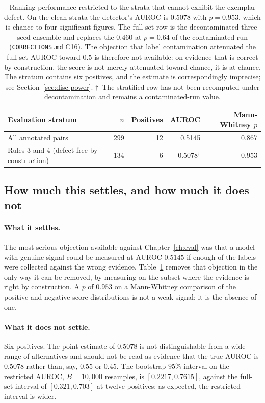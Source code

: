 \begin{table}[t]
\centering
\small
\begin{tabular}{lrrrr}
\toprule
\textbf{Evaluation stratum} & \textbf{$n$} & \textbf{Positives} &
\textbf{AUROC} & \textbf{Mann-Whitney $p$} \\
\midrule
All annotated pairs                      & 299 & 12 & 0.5145 & 0.867 \\
Rules 3 and 4 (defect-free by construction) & 134 & 6  & 0.5078$^{\dagger}$ & 0.953 \\
\bottomrule
\end{tabular}
\caption{Ranking performance restricted to the strata that cannot exhibit the
exemplar defect. On the clean strata the detector's AUROC is $0.5078$ with
$p = 0.953$, which is chance to four significant figures. The full-set row is the
decontaminated three-seed ensemble and replaces the $0.460$ at $p = 0.64$ of the
contaminated run (\texttt{CORRECTIONS.md} C16). The objection that
label contamination attenuated the full-set AUROC toward $0.5$ is
therefore not available: on evidence that is correct by construction, the score
is not merely attenuated toward chance, it is at chance. The stratum contains
six positives, and the estimate is correspondingly imprecise; see
Section~\ref{sec:disc-power}. $\dagger$~The stratified row has not been
recomputed under decontamination and remains a contaminated-run value.}
\label{tab:disc-strata}
\end{table}

\subsection{How much this settles, and how much it does not}

\paragraph{What it settles.} The most serious objection available against
Chapter~\ref{ch:eval} was that a model with genuine signal could be measured at
AUROC $0.5145$ if enough of the labels were collected against the wrong evidence.
Table~\ref{tab:disc-strata} removes that objection in the only way it can be
removed, by measuring on the subset where the evidence is right by construction.
A $p$ of $0.953$ on a Mann-Whitney comparison of the positive and negative score
distributions is not a weak signal; it is the absence of one.

\paragraph{What it does not settle.} Six positives. The point estimate of
$0.5078$ is not distinguishable from a wide range of alternatives and should not
be read as evidence that the true AUROC is $0.5078$ rather than, say, $0.55$ or
$0.45$. The bootstrap $95\%$ interval on the restricted AUROC, $B = 10{,}000$
resamples, is $[0.2217, 0.7615]$, against the full-set interval of
$[0.321, 0.703]$ at twelve positives; as expected, the restricted interval is
wider.

